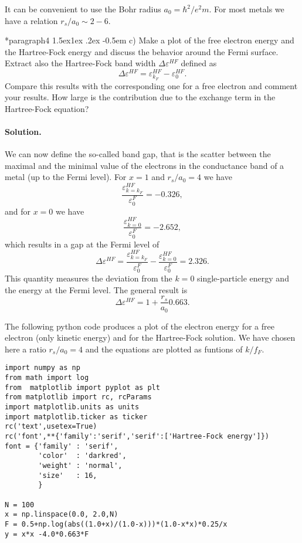 \documentclass[%
oneside,                 %
final,                   %
10pt]{article}
\makeatletter
\newenvironment{doconceexercise}{}{}
\newcommand\subex{\@startsection*{paragraph}{4}{\z@}%
                  {1.5ex\@plus1ex \@minus.2ex}%
                  {-0.5em}%
                  {\normalfont\normalsize\bfseries}}
\makeatother
\begin{document}
\begin{doconceexercise}

It can be convenient to use the Bohr radius $a_0=\hbar^2/e^2m$.
For most metals we have a relation $r_s/a_0\sim 2-6$.

\subex{c)}
Make a plot of the free electron energy and the Hartree-Fock energy and discuss the behavior around the Fermi surface. Extract also   the Hartree-Fock band width $\Delta\varepsilon^{HF}$ defined as
\[ 
\Delta\varepsilon^{HF}=\varepsilon_{k_{F}}^{HF}-
\varepsilon_{0}^{HF}.
\]
Compare this results with the corresponding one for a free electron and comment your results. How large is the contribution due to the exchange term in the Hartree-Fock equation?


\paragraph{Solution.}
We can now define the so-called band gap, that is the scatter between the maximal and the minimal value of the electrons in the conductance band of a metal (up to the Fermi level). 
For $x=1$ and $r_s/a_0=4$ we have 
\[
\frac{\varepsilon_{k=k_F}^{HF} }{\varepsilon_{0}^{F}} = -0.326,
\]
and for $x=0$ we have
\[
\frac{\varepsilon_{k=0}^{HF} }{\varepsilon_{0}^{F}} = -2.652,
\]
which results in a gap at the Fermi level of 
\[
\Delta \varepsilon^{HF} = \frac{\varepsilon_{k=k_F}^{HF} }{\varepsilon_{0}^{F}}-\frac{\varepsilon_{k=0}^{HF} }{\varepsilon_{0}^{F}} = 2.326.
\]
This quantity measures the deviation from the $k=0$ single-particle energy and the energy at the Fermi level.
The general result is 
\[
\Delta \varepsilon^{HF} = 1+\frac{r_s}{a_0}0.663.
\]

The following python code produces a plot of the electron energy for a free electron (only kinetic energy) and 
for the Hartree-Fock solution. We have chosen here a ratio $r_s/a_0=4$ and the equations are plotted as funtions
of $k/f_F$. 
\begin{verbatim}
import numpy as np
from math import log
from  matplotlib import pyplot as plt
from matplotlib import rc, rcParams
import matplotlib.units as units
import matplotlib.ticker as ticker
rc('text',usetex=True)
rc('font',**{'family':'serif','serif':['Hartree-Fock energy']})
font = {'family' : 'serif',
        'color'  : 'darkred',
        'weight' : 'normal',
        'size'   : 16,
        }

N = 100
x = np.linspace(0.0, 2.0,N)
F = 0.5+np.log(abs((1.0+x)/(1.0-x)))*(1.0-x*x)*0.25/x
y = x*x -4.0*0.663*F


\end{verbatim}
\end{doconceexercise}
\end{document}
